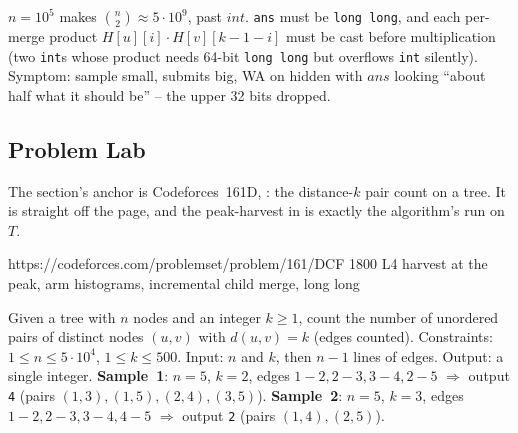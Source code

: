 \begin{warningbox}
$n=10^{5}$ makes $\binom{n}{2}\approx 5\cdot 10^{9}$, past $\mathit{int}$.
\lstinline{ans} must be \lstinline{long long}, and each per-merge product
$\mathit{H}[u][i]\cdot\mathit{H}[v][k-1-i]$ must be cast before
multiplication (two \lstinline{int}s whose product needs 64-bit
\texttt{long\,long} but overflows \lstinline{int} silently). Symptom: sample small,
submits big, WA on hidden with $\mathit{ans}$ looking ``about half what
it should be'' -- the upper 32 bits dropped.
\end{warningbox}

\subsection{Problem Lab}

The section's anchor is Codeforces~161D, : the
distance-$k$ pair count on a tree. It is 
straight off the page, and the peak-harvest in  is
exactly the algorithm's run on $T$.

  {https://codeforces.com/problemset/problem/161/D}{CF 1800 L4}
  {harvest at the peak, arm histograms, incremental child merge, long long}

\begin{problemstatement}
Given a tree with $n$ nodes and an integer $k\ge 1$, count the number of
unordered pairs of distinct nodes $(u,v)$ with $d(u,v)=k$ (edges
counted). Constraints: $1\le n\le 5\cdot 10^{4}$, $1\le k\le 500$. Input:
$n$ and $k$, then $n-1$ lines of edges. Output: a single integer.
\textbf{Sample~1}: $n=5$, $k=2$, edges $1\!-\!2,2\!-\!3,3\!-\!4,2\!-\!5$
$\Rightarrow$ output \texttt{4} (pairs $(1,3),(1,5),(2,4),(3,5)$).
\textbf{Sample~2}: $n=5$, $k=3$, edges $1\!-\!2,2\!-\!3,3\!-\!4,4\!-\!5$
$\Rightarrow$ output \texttt{2} (pairs $(1,4),(2,5)$).
\end{problemstatement}

